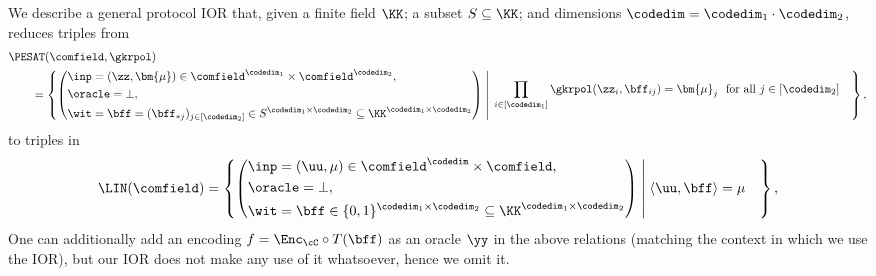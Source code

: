 We  describe a general protocol IOR  that, given a finite field $\KK$; %
 a subset $S\subseteq \KK$; and dimensions $\codedim=\codedim_1\cdot \codedim_2$, reduces triples from 
%
\begin{align*}
&\PESAT(\comfield, \gkrpol)\\ &\qquad = \left\{ \left(\begin{aligned} &\inp=(\zz,\bm{\mu})\in \comfield^{\codedim_1}\times \comfield^{\codedim_2}, \\
&\oracle=\bot,\\
&\wit=\bff= (\bff_{*j})_{j\in [\codedim_2]}\in S^{\codedim_1 \times \codedim_2} \subseteq \KK^{\codedim_1 \times \codedim_2}\end{aligned}\right) \;\middle|\;  \begin{aligned}   %
&\prod_{i\in[\codedim_1]} \gkrpol(\zz_i, \bff_{ij}) = \bm{\mu}_j \ \text{ for all } j\in [\codedim_2]\end{aligned}  \right\},
\end{align*}
%
to triples in 
%
$$
\LIN( \comfield)  = \left\{ \left(\begin{aligned} &\inp=(\uu,\mu)\in \comfield^\codedim \times \comfield, \\
&\oracle=\bot,\\
&\wit= \bff\in \{0,1\}^{\codedim_1\times \codedim_2}\subseteq \KK^{\codedim_1 \times \codedim_2}\end{aligned}\right) \;\middle|\;  \begin{aligned} 
&\langle \uu, \bff\rangle = \mu  \end{aligned}\right\},
$$
%
One can additionally add an encoding $f=\Enc_\cC\circ T (\bff)$ as an oracle $\yy$ in the above relations (matching the context in which we use the IOR), but our IOR does not make any use of it whatsoever, hence we omit it. 


